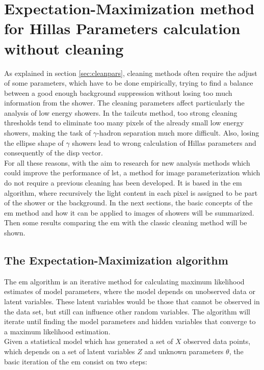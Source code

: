 \documentclass[main.tex]{subfiles}
\begin{document}
\section[Expectation-Maximization method for Hillas Parameters...]{Expectation-Maximization method for Hillas Parameters calculation without cleaning} \label{sec:EM}

As explained in section \ref{sec:cleanpars}, cleaning methods often require the adjust of some parameters, which have to be done empirically, trying to find a balance between a good enough background suppression without losing too much information from the shower. The cleaning parameters affect particularly the analysis of low energy showers. In the tailcuts method, too strong cleaning thresholds tend to eliminate too many pixels of the already small low energy showers, making the task of $\gamma$-hadron separation much more difficult. Also, losing the ellipse shape of $\gamma$ showers lead to wrong calculation of Hillas parameters and consequently of the disp vector.\\
For all these reasons, with the aim to research for new analysis methods which could improve the performance of \gls{lst}, a method for image parameterization which do not require a previous cleaning has been developed. It is based in the \gls{em} algorithm, where recursively the light content in each pixel is assigned to be part of the shower or the background. In the next sections, the basic concepts of the \gls{em} method and how it can be applied to images of showers will be summarized. Then some results comparing the \gls{em} with the classic cleaning method will be shown. 

\subsection{The Expectation-Maximization algorithm} \label{sec:em}

The \gls{em} algorithm \cite{1977EM} is an iterative method for calculating maximum likelihood estimates of model parameters, where the model depends on unobserved data or latent variables. These latent variables would be those that cannot be observed in the data set, but still can influence other random variables. The algorithm will iterate until finding the model parameters and hidden variables that converge to a maximum likelihood estimation.\\
Given a statistical model which has generated a set of $X$ observed data points, which depends on a set of latent variables $Z$ and unknown parameters $\theta$, the basic iteration of the \gls{em} consist on two steps:
\end{document}
